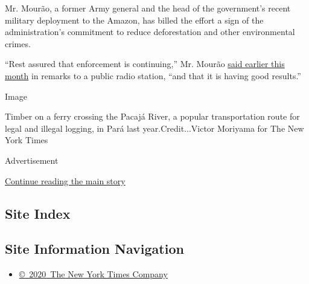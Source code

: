 Mr. Mourão, a former Army general and the head of the government's
recent military deployment to the Amazon, has billed the effort a sign
of the administration's commitment to reduce deforestation and other
environmental crimes.

``Rest assured that enforcement is continuing,'' Mr. Mourão
\href{https://www.gov.br/pt-br/noticias/meio-ambiente-e-clima/2020/07/em-programa-de-radio-mourao-fala-sobre-fiscalizacao-na-amazonia}{said
earlier this month} in remarks to a public radio station, ``and that it
is having good results.''

Image

Timber on a ferry crossing the Pacajá River, a popular transportation
route for legal and illegal logging, in Pará last year.Credit...Victor
Moriyama for The New York Times

Advertisement

\protect\hyperlink{after-bottom}{Continue reading the main story}

\hypertarget{site-index}{%
\subsection{Site Index}\label{site-index}}

\hypertarget{site-information-navigation}{%
\subsection{Site Information
Navigation}\label{site-information-navigation}}

\begin{itemize}
\tightlist
\item
  \href{https://help.nytimes.com/hc/en-us/articles/115014792127-Copyright-notice}{©~2020~The
  New York Times Company}
\end{itemize}

